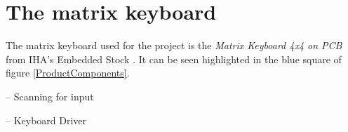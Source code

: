 \section{The matrix keyboard}
\label{section:MatrixKeyboard}

The matrix keyboard used for the project is the \textit{Matrix Keyboard 4x4 on PCB} from IHA's Embedded Stock \cite{MatrixKeyboard}. It can be seen highlighted in the blue square of figure \ref{ProductComponents}.

 


-- Scanning for input

-- Keyboard Driver
